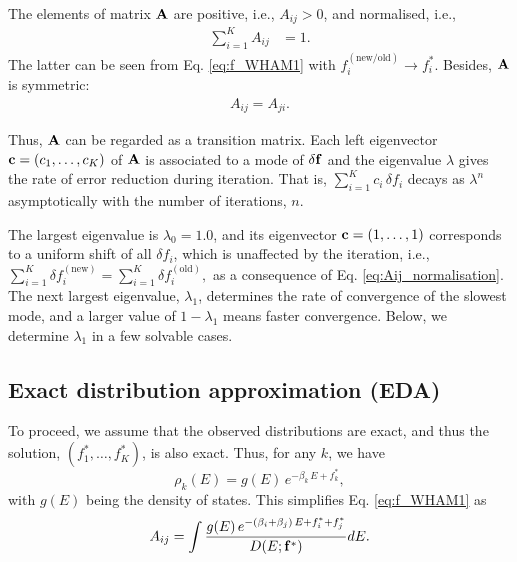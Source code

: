 \documentclass{gMOS2e}
\begin{document}
The elements of matrix $\mathbf{A}$
are positive, i.e.,
%
$A_{ij} > 0$,
and normalised, i.e.,
%
\begin{align}
\sum_{i = 1}^K A_{ij} &= 1.
\label{eq:Aij_normalisation}
\end{align}
%
The latter can be seen from
Eq. \eqref{eq:f_WHAM1}
with
$f_i^\mathrm{(new/old)} \rightarrow f_i^*$.
%
Besides,
$\mathbf{A}$ is symmetric:
%
\begin{align}
  A_{ij} = A_{ji}.
\label{eq:Aij_symmetry}
\end{align}
%



Thus,
$\mathbf{A}$
can be regarded as a transition matrix\cite{
newman}.
%
Each left eigenvector
$\mathbf{c} = (c_1, \dots, c_K)$
of $\mathbf{A}$
is associated to a mode of $\delta \mathbf{f}$
and the eigenvalue $\lambda$
gives the rate of error reduction
during iteration.
%
That is,
$\sum_{i = 1}^K c_i \, \delta f_i$
decays as $\lambda^n$
asymptotically
with the number of iterations, $n$.




The largest eigenvalue is $\lambda_0 = 1.0$,
and its eigenvector
$\mathbf{c} = (1, \dots, 1)$
corresponds to a uniform shift of all
$\delta f_i$,
which is unaffected by the iteration,
%
i.e.,
$
\sum_{i=1}^K \delta f_i^\mathrm{(new)}
=
\sum_{i=1}^K \delta f_i^\mathrm{(old)},
$
as a consequence of
Eq. \eqref{eq:Aij_normalisation}.
%
The next largest eigenvalue,
$\lambda_1$,
determines the rate of convergence
of the slowest mode,
%
and a larger value of
$1 - \lambda_1$
means faster convergence.
%
Below,
we determine $\lambda_1$
in a few solvable cases.



\subsection{Exact distribution approximation (EDA)}



To proceed, we assume that
the observed distributions are exact,
%
and thus the solution,
$(f_1^*, \dots, f_K^*)$,
is also exact.
%
Thus, for any $k$, we have
%
\begin{equation}
\rho_k(E)
=
g(E) \,
e^{-\beta_k \, E + f_k^*},
\label{eq:rho_EDA}
\end{equation}
%
with $g(E)$ being the density of states.
%
%
This simplifies Eq. \eqref{eq:f_WHAM1} as
%
\begin{align}
A_{ij}
=
\int
\frac
{
  g(E) \, e^{ -(\beta_i + \beta_j) \, E + f_i^* + f_j^*}
}
{
  D(E; \mathbf{f}^*)
}
dE.
\label{eq:Aij_EDA}
\end{align}
\end{document}

